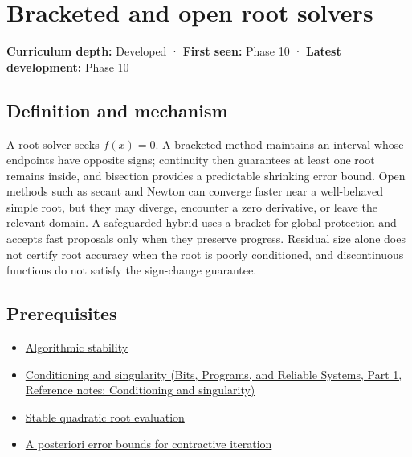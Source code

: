 \hypertarget{appendix-f63eb850796d}{}\label{referencestart:appendix-f63eb850796d}
\section{Bracketed and open root solvers}\label{appendix-f63eb850796d-bracketed-and-open-root-solvers}

\hypertarget{appendix-f63eb850796d-bracketed-and-open-root-solvers}{}

\textbf{Curriculum depth:} Developed · \textbf{First seen:} Phase 10 · \textbf{Latest development:} Phase 10

\begin{allmightroledefinition}

\subsection{Definition and mechanism}\label{appendix-f63eb850796d-definition-and-mechanism}

\hypertarget{appendix-f63eb850796d-definition-and-mechanism}{}

A root solver seeks \(f(x)=0\). A bracketed method maintains an interval whose endpoints have opposite signs; continuity then guarantees at least one root remains inside, and bisection provides a predictable shrinking error bound. Open methods such as secant and Newton can converge faster near a well-behaved simple root, but they may diverge, encounter a zero derivative, or leave the relevant domain. A safeguarded hybrid uses a bracket for global protection and accepts fast proposals only when they preserve progress. Residual size alone does not certify root accuracy when the root is poorly conditioned, and discontinuous functions do not satisfy the sign-change guarantee.

\end{allmightroledefinition}

\subsection{Prerequisites}\label{appendix-f63eb850796d-prerequisites}

\hypertarget{appendix-f63eb850796d-prerequisites}{}

\begin{itemize}
\tightlist
\item
  \hyperref[appendix-aa2bf0d79639]{Algorithmic stability}
\item
  \href{../01-Bits-Programs-and-Reliable-Systems-P01/main.pdf\#nameddest=appendix-8f6a01f284a7}{Conditioning and singularity (Bits, Programs, and Reliable Systems, Part 1, Reference notes: Conditioning and singularity)}
\item
  \hyperref[appendix-b9afba7f63e5]{Stable quadratic root evaluation}
\item
  \hyperref[appendix-d83b0ad1be7f]{A posteriori error bounds for contractive iteration}
\end{itemize}

